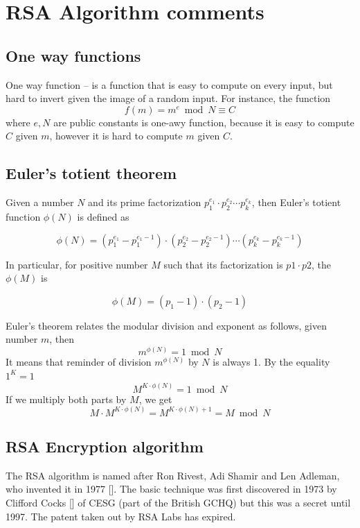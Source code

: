 \chapter*{RSA Algorithm comments}\label{ch:rsa-algorithm-comments}


\section*{One way functions}\label{sec:one-way-functions}
One way function -- is a function that is easy to compute on every input, but
hard to invert given the image of a random input.
For instance, the function
\begin{equation*}
    f(m) = m^e \bmod N \equiv C
\end{equation*}
where $e, N$ are public constants is one-awy function,
because it is easy to compute $C$ given $m$, however it is hard to compute $m$ given $C$.


\section*{Euler's totient theorem}\label{sec:euler's-totient-theorem}
Given a number $N$ and its prime factorization $p_1^{e_1}\cdot p_2^{e_2} \cdots p_k^{e_k}$, then Euler's totient function
$\phi(N)$ is defined as

\[
    \phi(N) = (p_1^{e_1} - p_1^{e_1 - 1}) \cdot (p_2^{e_2} - p_2^{e_2 - 1}) \cdots (p_k^{e_k} - p_k^{e_k - 1})
\]

In particular, for positive number $M$ such that its factorization is $p1 \cdot p2$, the $\phi(M)$ is

\[
    \phi(M) = (p_1 -1) \cdot (p_2 - 1)
\]

Euler's theorem relates the modular division and exponent as follows, given number $m$, then
\[
    m^{\phi(N)} = 1 \bmod N
\]
It means that reminder of division $m^{\phi(N)}$ by $N$ is always 1.
By the equality $1^K = 1$
\[
    M^{K \cdot \phi(N)} = 1 \bmod N
\]
If we multiply both parts by $M$, we get
\[
    M \cdot M^{K \cdot \phi(N)} = M^{K \cdot \phi(N) + 1} = M \bmod N
\]




\section*{RSA Encryption algorithm}\label{sec:rsa-encryption-algorithm}
The RSA algorithm is named after Ron Rivest, Adi Shamir and Len Adleman, who invented it in 1977 [\cite{rivest1978method}].
The basic technique was first discovered in 1973 by Clifford Cocks [\cite{cocks1973note}] of CESG (part of the British GCHQ)
but this was a secret until 1997.
The patent taken out by RSA Labs has expired.

